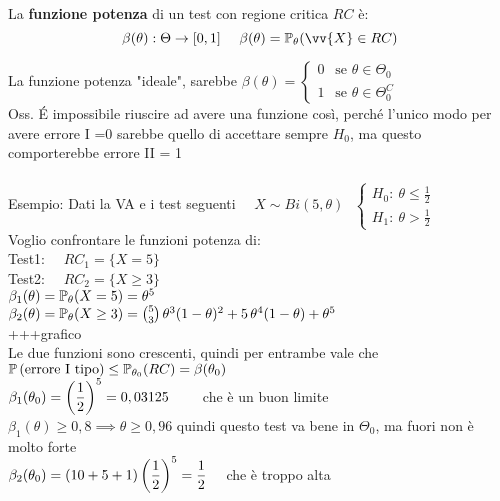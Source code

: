 \begin{defi}
    La \textbf{funzione potenza} di un test con regione critica $RC$ è:
    \[
    \beta(\theta) : \Theta \to [0,1] \ \ \ \ \beta(\theta)=\PP_{\theta}(\vv{X}\in RC)
    \]
\end{defi}

\phantom{}

La funzione potenza "ideale", sarebbe $\beta(\theta)= \begin{cases}
    0 \ \ \text{ se } \theta\in \Theta_0\\
    1 \ \ \text{ se } \theta\in\Theta_0^C
\end{cases}$\\

Oss. É impossibile riuscire ad avere una funzione così, perché l'unico modo per avere errore I =0 sarebbe quello di accettare sempre $H_0$, ma questo comporterebbe errore II = 1\\ \\



Esempio: Dati la VA e i test seguenti \ \ $X\sim Bi(5,\theta) \ \ \ \begin{cases}
    H_0 : \ \theta\le \frac12\\
    H_1 : \ \theta>\frac{1}{2}
\end{cases}$\\
Voglio confrontare le funzioni potenza di:\\
Test1: \ \ $RC_1 =\{X=5\}$\\
Test2: \ \ $RC_2 = \{X\ge3\}$\\

$\beta_1(\theta)=\mathbb P_{\theta}(X=5)=\theta^5$\\
$\beta_2(\theta)=\mathbb P_{\theta}(X\ge3) = \binom{5}{3}\,\theta^3(1-\theta)^2 + 5\,\theta^4(1-\theta) +\theta^5$\\
+++grafico\\

Le due funzioni sono crescenti, quindi per entrambe vale che $\mathbb{P} \left( \text{errore I tipo} \right) \le \mathbb P_{\theta_0}(RC) = \beta(\theta_0)$\\

$\beta_1(\theta_0)=\left(\dfrac12\right)^5=0,03125$ \ \ \ \ che è un buon limite\\
$\beta_1(\theta)\ge0,8 \implies \theta\ge0,96$ quindi questo test va bene in $\Theta_0$, ma fuori non è molto forte\\

$\beta_2(\theta_0)= (10 + 5 +1 )\left(\dfrac12\right)^5 = \dfrac12$ \ \ che è troppo alta\\ \\

